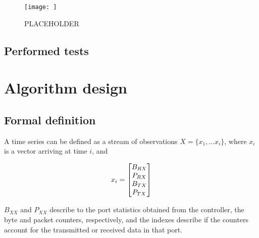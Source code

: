 \pagebreak
\begin{figure} 
    \centering
    \texttt{[image: ]}
    \caption {PLACEHOLDER}
    \label{fig:test_setup}
\end{figure} 

\subsection {Performed tests}

\subsubsection {}


\section {Algorithm design}
\subsection {Formal definition}

A time series can be defined as a stream of observations $X = \{x_1, ... x_i\}$, where $x_i$ is a vector arriving at time $i$, and

\begin {equation}
\centering
x_i = 
\begin{bmatrix}
B_{RX}\\
P_{RX}\\
B_{TX}\\
P_{TX}\\
\end{bmatrix}
\end {equation}

\par $B_{XX}$ and $P_{XX}$ describe to the port statistics obtained from the controller, the byte and packet counters, respectively, and the indexes describe
if the counters account for the transmitted or received data in that port.

